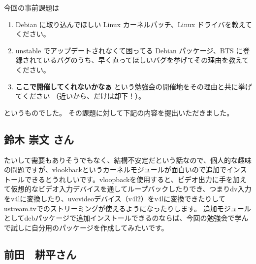 \documentclass[mingoth,a4paper]{jsarticle}
\begin{document}

今回の事前課題は
\begin{enumerate}
 \item Debian に取り込んでほしい Linux カーネルパッチ、Linux ドライバを教えてください。
 \item unstable でアップデートされなくて困ってる Debian パッケージ、BTS に登録されているバグのうち、早く直ってほしいバグを挙げてその理由を教えてください。
 \item {\bf ここで開催してくれないかなぁ} という勉強会の開催地をその理由と共に挙げてください （近いから、だけは却下！）。
\end{enumerate}
というものでした。
その課題に対して下記の内容を提出いただきました。

\subsection{鈴木 崇文 さん}
たいして需要もありそうでもなく、結構不安定だという話なので、個人的な趣味の問題ですが、vlookbackというカーネルモジュールが面白いので追加でインストールできるとうれしいです。vloopbackを使用すると、ビデオ出力に手を加えて仮想的なビデオ入力デバイスを通してループバックしたりでき、つまりdv入力をv4lに変換したり、uvcvideoデバイス（v4l2）をv4lに変換できたりしてustream.tvでのストリーミングが使えるようになったりします。
追加モジュールとしてdebパッケージで追加インストールできるのならば、今回の勉強会で学んで試しに自分用のパッケージを作成してみたいです。

\subsection{前田　耕平さん}
\end{document}
